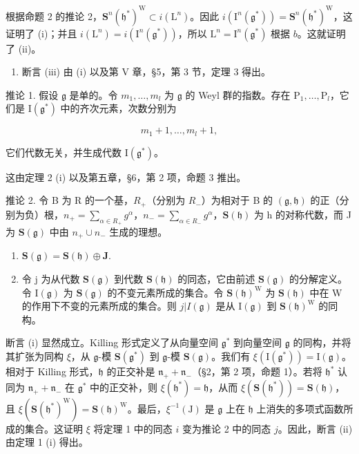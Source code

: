 根据命题 2 的推论 2，\(\mathbf{S}^n (\mathfrak{h}^*)^{\mathrm{W}}\subset i(\mathrm{L}^n)\)。因此 \(i(\mathrm{I}^n (\mathfrak{g}^*)) = \mathbf{S}^n (\mathfrak{h}^*)^{\mathrm{W}}\)，这证明了 (i)；并且 \(i(\mathrm{L}^n) = i(\mathrm{I}^n (\mathfrak{g}^*))\)，所以 \(\mathrm{L}^n = \mathrm{I}^n (\mathfrak{g}^*)\) 根据 \(b\)。这就证明了 (ii)。

\begin{enumerate}
\def\labelenumi{\alph{enumi})}
\setcounter{enumi}{3}
\tightlist
\item
  断言 (iii) 由 (i) 以及第 V 章，§5，第 3 节，定理 3 得出。
\end{enumerate}

推论 1. 假设 \(\mathfrak{g}\) 是单的。令 \(m_1, \ldots, m_l\) 为 \(\mathfrak{g}\) 的 Weyl 群的指数。存在 \(\mathrm{P}_1, \ldots, \mathrm{P}_l\)，它们是 \(\mathrm{I}(\mathfrak{g}^*)\) 中的齐次元素，次数分别为

\[
m _ {1} + 1, \dots , m _ {l} + 1,
\]

它们代数无关，并生成代数 \(\mathrm{I}(\mathfrak{g}^*)\)。

这由定理 2 (i) 以及第五章，§6，第 2 项，命题 3 推出。

推论 2. 令 B 为 R 的一个基，\(R_{+}\)（分别为 \(R_{-}\)）为相对于 B 的 \((\mathfrak{g},\mathfrak{h})\) 的正（分别为负）根，\(n_{+}=\sum_{\alpha\in R_{+}}g^{\alpha}\)，\(n_{-}=\sum_{\alpha\in R_{-}}g^{\alpha}\)，\(\mathbf{S}(\mathfrak{h})\) 为 h 的对称代数，而 J 为 \(\mathbf{S}(\mathfrak{g})\) 中由 \(n_{+}\cup n_{-}\) 生成的理想。

\begin{enumerate}
\def\labelenumi{(\roman{enumi})}
\item
  \(\mathbf{S}(\mathfrak{g}) = \mathbf{S}(\mathfrak{h}) \oplus \mathbf{J}.\)
\item
令 j 为从代数 \(\mathbf{S}(\mathfrak{g})\) 到代数 \(\mathbf{S}(\mathfrak{h})\) 的同态，它由前述 \(\mathbf{S}(\mathfrak{g})\) 的分解定义。令 \(\mathrm{I}(\mathfrak{g})\) 为 \(\mathbf{S}(\mathfrak{g})\) 的不变元素所成的集合。令 \(\mathbf{S}(\mathfrak{h})^{\mathrm{W}}\) 为 \(\mathbf{S}(\mathfrak{h})\) 中在 W 的作用下不变的元素所成的集合。则 \(j|I(\mathfrak{g})\) 是从 \(\mathrm{I}(\mathfrak{g})\) 到 \(\mathbf{S}(\mathfrak{h})^{\mathrm{W}}\) 的同构。
\end{enumerate}

断言 (i) 显然成立。Killing 形式定义了从向量空间 \(\mathfrak{g}^*\) 到向量空间 \(\mathfrak{g}\) 的同构，并将其扩张为同构 \(\xi\)，从 \(\mathfrak{g}\)-模 \(\mathbf{S}(\mathfrak{g}^*)\) 到 \(\mathfrak{g}\)-模 \(\mathbf{S}(\mathfrak{g})\)。我们有 \(\xi (\mathrm{I}(\mathfrak{g}^*)) = \mathrm{I}(\mathfrak{g})\)。相对于 Killing 形式，\(\mathfrak{h}\) 的正交补是 \(\mathfrak{n}_{+} + \mathfrak{n}_{-}\)（§2，第 2 项，命题 1）。若将 \(\mathfrak{h}^*\) 认同为 \(\mathfrak{n}_{+} + \mathfrak{n}_{-}\) 在 \(\mathfrak{g}^*\) 中的正交补，则 \(\xi (\mathfrak{h}^*) = \mathfrak{h}\)，从而 \(\xi (\mathbf{S}(\mathfrak{h}^*)) = \mathbf{S}(\mathfrak{h})\)，且 \(\xi (\mathbf{S}(\mathfrak{h}^*)^{\mathrm{W}}) = \mathbf{S}(\mathfrak{h})^{\mathrm{W}}\)。最后，\(\xi^{-1}(\mathrm{J})\) 是 \(\mathfrak{g}\) 上在 \(\mathfrak{h}\) 上消失的多项式函数所成的集合。这证明 \(\xi\) 将定理 1 中的同态 \(i\) 变为推论 2 中的同态 \(j\)。因此，断言 (ii) 由定理 1 (i) 得出。

